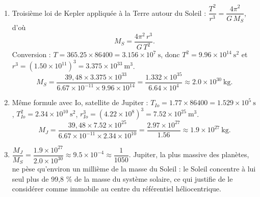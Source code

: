 \documentclass[11pt]{article}
\begin{document}
\begin{corrige}
\begin{enumerate}
\item Troisième loi de Kepler appliquée à la Terre autour du Soleil : $\dfrac{T^2}{r^3} = \dfrac{4\pi^2}{G\,M_S}$, d'où
\[ M_S = \dfrac{4\pi^2\,r^3}{G\,T^2}. \]
Conversion : $T = \num{365,25} \times \num{86400} = \num{3,156}\times 10^{7}\ \mathrm{s}$, donc $T^2 = \num{9,96}\times 10^{14}\ \mathrm{s^2}$ et $r^3 = (\num{1,50}\times 10^{11})^3 = \num{3,375}\times 10^{33}\ \mathrm{m^3}$.
\[ M_S = \dfrac{39,48 \times \num{3,375}\times 10^{33}}{\num{6,67}\times 10^{-11} \times \num{9,96}\times 10^{14}} = \dfrac{\num{1,332}\times 10^{35}}{\num{6,64}\times 10^{4}} \approx \num{2,0}\times 10^{30}\ \mathrm{kg}. \]
\item Même formule avec Io, satellite de Jupiter : $T_{Io} = \num{1,77} \times \num{86400} = \num{1,529}\times 10^{5}\ \mathrm{s}$, $T_{Io}^2 = \num{2,34}\times 10^{10}\ \mathrm{s^2}$, $r_{Io}^3 = (\num{4,22}\times 10^{8})^3 = \num{7,52}\times 10^{25}\ \mathrm{m^3}$.
\[ M_J = \dfrac{39,48 \times \num{7,52}\times 10^{25}}{\num{6,67}\times 10^{-11} \times \num{2,34}\times 10^{10}} = \dfrac{\num{2,97}\times 10^{27}}{\num{1,56}} \approx \num{1,9}\times 10^{27}\ \mathrm{kg}. \]
\item $\dfrac{M_J}{M_S} = \dfrac{\num{1,9}\times 10^{27}}{\num{2,0}\times 10^{30}} \approx \num{9,5}\times 10^{-4} \approx \dfrac{1}{1050}$. Jupiter, la plus massive des planètes, ne pèse qu'environ un millième de la masse du Soleil : le Soleil concentre à lui seul plus de 99,8 \% de la masse du système solaire, ce qui justifie de le considérer comme immobile au centre du référentiel héliocentrique.
\end{enumerate}
\end{corrige}
\end{document}
